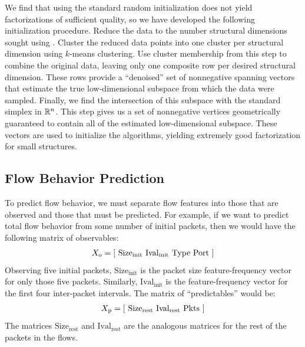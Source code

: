 \documentclass[conference]{IEEEtran}
\begin{document}

We find that using the standard random  initialization does not yield factorizations of sufficient quality, so we have developed the following initialization procedure.
Reduce the data to the number structural dimensions sought using .
Cluster the reduced data points into one cluster per structural dimension using $k$-means clustering.
Use cluster membership from this step to combine the original data, leaving only one composite row per desired structural dimension.
These rows provide a ``denoised'' set of nonnegative spanning vectors that estimate the true low-dimensional subspace from which the data were sampled.
Finally, we find the intersection of this subspace with the standard simplex in $\mathbb{R}^n$.\cddnote
This step gives us a set of nonnegative vertices geometrically guaranteed to contain all of the estimated low-dimensional subspace.
These vectors are used to initialize the  algorithms, yielding extremely good factorization for small structures.

\subsection{Flow Behavior Prediction}

To predict flow behavior, we must separate flow features into those that are observed and those that must be predicted.
For example, if we want to predict total flow behavior from some number of initial packets, then we would have the following matrix of observables:
\begin{align}
  X_\text{o} = {\left[ ~
    \text{Size}_\text{init} ~
    \text{Ival}_\text{init} ~
    \text{Type} ~
    \text{Port} ~
  \right]}
\end{align}
Observing five initial packets, $\text{Size}_\text{init}$ is the packet size feature-frequency vector for only those five packets. Similarly, $\text{Ival}_\text{init}$ is the feature-frequency vector for the first four inter-packet intervals.
The matrix of ``predictables'' would be:
\begin{align}
  X_\text{p} = {\left[ ~
    \text{Size}_\text{rest} ~
    \text{Ival}_\text{rest} ~
    \text{Pkts} ~
  \right]}
\end{align}
The matrices $\text{Size}_\text{rest}$ and $\text{Ival}_\text{rest}$ are the analogous  matrices for the rest of the packets in the flows.
\end{document}

